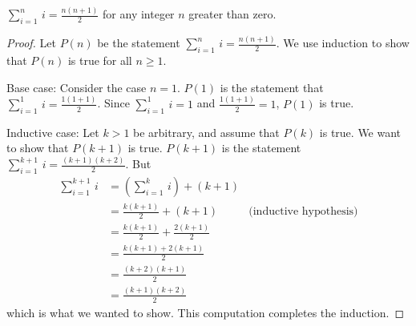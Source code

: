 \begin{theorem}\label{T-simplesum}
$\displaystyle \sum_{i=1}^n\, i=\frac{n(n+1)}{2}$ for any integer $n$ greater than zero.
\end{theorem}
\begin{proof}
Let $P(n)$ be the statement $\displaystyle \sum_{i=1}^n\,i=\frac{n(n+1)}{2}$.
We use induction to show that $P(n)$ is true for all $n\geq 1$.

Base case:  Consider the case $n=1$. $P(1)$ is the statement
that $\displaystyle \sum_{i=1}^1\,i=\frac{1(1+1)}{2}$.
Since $\displaystyle \sum_{i=1}^1\,i=1$ and $\displaystyle\frac{1(1+1)}{2}=1$,
$P(1)$ is true.

Inductive case:  Let $k>1$ be arbitrary, and assume that $P(k)$ is true.
We want to show that $P(k+1)$ is true.  $P(k+1)$ is the statement
$\displaystyle \sum_{i=1}^{k+1}\,i=\frac{(k+1)(k+2)}{2}$.  But
\begin{align*}
   \sum_{i=1}^{k+1}\,i &= \left(\sum_{i=1}^k\,i\right)+(k+1) &\\
                       &= \frac{k(k+1)}{2}+(k+1) &\text{(inductive hypothesis)}\\
                       &= \frac{k(k+1)}{2}+\frac{2(k+1)}{2}\\
                       &= \frac{k(k+1)+2(k+1)}{2}\\
                       &= \frac{(k+2)(k+1)}{2}\\
                       &= \frac{(k+1)(k+2)}{2}
\end{align*}
which is what we wanted to show.  This computation completes the induction.
\end{proof}

